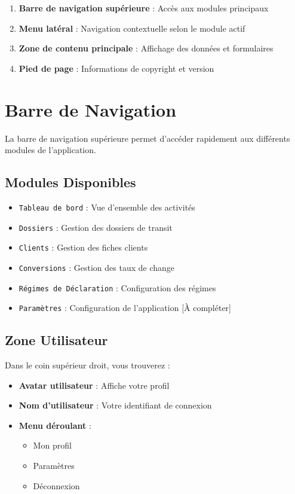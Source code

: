 \documentclass[12pt,a4paper]{report}
\begin{document}
\begin{enumerate}[leftmargin=*]
    \item \textbf{Barre de navigation supérieure} : Accès aux modules principaux
    \item \textbf{Menu latéral} : Navigation contextuelle selon le module actif
    \item \textbf{Zone de contenu principale} : Affichage des données et formulaires
    \item \textbf{Pied de page} : Informations de copyright et version
\end{enumerate}

\section{Barre de Navigation}

La barre de navigation supérieure permet d'accéder rapidement aux différents modules de l'application.

\subsection{Modules Disponibles}

\begin{itemize}[leftmargin=*]
    \item \texttt{Tableau de bord} : Vue d'ensemble des activités
    \item \texttt{Dossiers} : Gestion des dossiers de transit
    \item \texttt{Clients} : Gestion des fiches clients
    \item \texttt{Conversions} : Gestion des taux de change
    \item \texttt{Régimes de Déclaration} : Configuration des régimes
    \item \texttt{Paramètres} : Configuration de l'application [À compléter]
\end{itemize}

\subsection{Zone Utilisateur}

Dans le coin supérieur droit, vous trouverez :

\begin{itemize}[leftmargin=*]
    \item \textbf{Avatar utilisateur} : Affiche votre profil
    \item \textbf{Nom d'utilisateur} : Votre identifiant de connexion
    \item \textbf{Menu déroulant} :
    \begin{itemize}
        \item Mon profil
        \item Paramètres
        \item Déconnexion
    \end{itemize}
\end{itemize}
\end{document}
